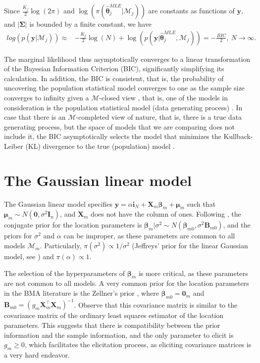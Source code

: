 Since $\frac{K_j}{2}\log(2\pi)$ and $\log(\pi(\bm{\hat{\theta}}_j^{MLE} | \mathcal{M}_j))$ are constants as functions of $\bm{y}$, and $|\bm{\Sigma}|$ is bounded by a finite constant, we have
\begin{align*}
	log\left(p(\bm{y} | \mathcal{M}_j)\right)\approx& -\frac{K_j}{2}\log(N)+\log(p(\bm{y}| \bm{\hat{\theta}}_j^{MLE},\mathcal{M}_j))= -\frac{BIC}{2}, \ N \rightarrow \infty.
\end{align*}

The marginal likelihood thus asymptotically converges to a linear transformation of the Bayesian Information Criterion (BIC), significantly simplifying its calculation. In addition, the BIC is consistent, that is, the probability of uncovering the population statistical model converges to one as the sample size converges to infinity given a $\mathcal{M}$-closed view \cite[Chap.~6]{Bernardo1994}, that is, one of the models in consideration is the population statistical model (data generating process) \cite{schwarz1978estimating, burnham2004multimodel}. In case that there is an $\mathcal{M}$-completed view of nature, that is, there is a true data generating process, but the space of models that we are comparing does not include it, the BIC asymptotically selects the model that minimizes the Kullback-Leiber (KL) divergence to the true (population) model \cite[Chap. ~4]{claeskens2008model}. 

\section{The Gaussian linear model}\label{sec10_2}

The Gaussian linear model specifies $\bm{y}=\alpha\bm{i}_N+\bm{X}_m\bm{\beta}_m+\bm{\mu}_m$ such that $\bm{\mu}_m\sim{N}(\bm{0},\sigma^2\bm{I}_n)$, and $\bm{X}_m$ does not have the column of ones. Following \cite{koop2003bayesian}, the conjugate prior for the location parameters is $\bm{\beta}_m|\sigma^2 \sim {N}(\bm{\beta}_{m0}, \sigma^2 \bm{B}_{m0})$, and the priors for $\sigma^2$ and $\alpha$ can be improper, as these parameters are common to all models $\mathcal{M}_m$. Particularly, $\pi(\sigma^2)\propto 1/\sigma^2$ (Jeffreys' prior for the linear Gaussian model, see \cite{prior1991bayesian}) and $\pi(\alpha)\propto 1$.

The selection of the hyperparameters of $\bm{\beta}_m$ is more critical, as these parameters are not common to all models. A very common prior for the location parameters in the BMA literature is the Zellner's prior \cite{zellner1986assessing}, where $\bm{\beta}_{m0}=\bm{0}_m$ and $\bm{B}_{m0}=(g_m\bm{X}_m^{\top}\bm{X}_m)^{-1}$. Observe that this covariance matrix is similar to the covariance matrix of the ordinary least squares estimator of the location parameters. This suggests that there is compatibility between the prior information and the sample information, and the only parameter to elicit is $g_m\geq 0$, which facilitates the elicitation process, as eliciting covariance matrices is a very hard endeavor.

